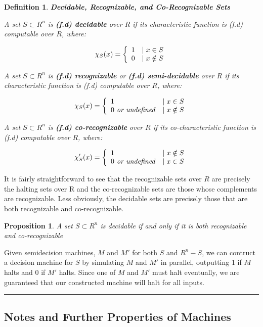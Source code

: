 \documentclass[twoside]{article}
\newtheorem{proposition}{Proposition}[section]
\newtheorem{definition}{Definition}[section]
\newenvironment{proofsketch}{{\bf Proof Sketch:}}{\hfill\rule{2mm}{2mm}}
\begin{document}
\begin{definition}{\textbf{Decidable, Recognizable, and Co-Recognizable Sets}}
  
  A set $S \subset R^n$ is \textbf{(f.d) decidable} over $R$ if its
  characteristic function  is (f.d)
  computable over $R$, where:
  
  $$\chi_S(x) =  \left\{ \begin{array}{ll} 1 & \mid x \in S \\ 0 & \mid x \notin S \end{array} \right.$$
  
  A set $S \subset R^n$ is \textbf{(f.d) recognizable} or
  \textbf{(f.d) semi-decidable} over $R$ if its characteristic
  function  is (f.d) computable over $R$,
  where:
  
  $$\chi_S(x) =  \left\{ \begin{array}{ll} 1 & \mid x \in S \\ 0 \text{\emph{ or undefined}} & \mid x \notin S \end{array} \right.$$
  
  A set $S \subset R^n$ is \textbf{(f.d) co-recognizable} over $R$
  if its co-characteristic function  is (f.d)
  computable over $R$, where:
  
  $$\chi'_S(x) =  \left\{ \begin{array}{ll} 1 & \mid x \notin S \\ 0 \text{\emph{ or undefined}} & \mid x \in S \end{array} \right.$$
  
\end{definition}

It is fairly straightforward to see that the recognizable sets over
$R$ are precisely the halting sets over R and the co-recognizable sets
are those whose complements are recognizable. Less obviously, the
decidable sets are precisely those that are both recognizable and
co-recognizable.

\begin{proposition}{A set $S \subset R^n$ is decidable if and only if it is
  both recognizable and co-recognizable}
\end{proposition}
\begin{proofsketch}
  
  Given semidecision machines, $M$ and $M'$ for both $S$ and $R^n -
  S$, we can contruct a decision machine for $S$ by simulating $M$ and
  $M'$ in parallel, outputting 1 if $M$ halts and 0 if $M'$ halts.
  Since one of $M$ and $M'$ must halt eventually, we are guaranteed
  that our constructed machine will halt for all inputs.


\end{proofsketch}

\subsection{Notes and Further Properties of Machines}
\end{document}
